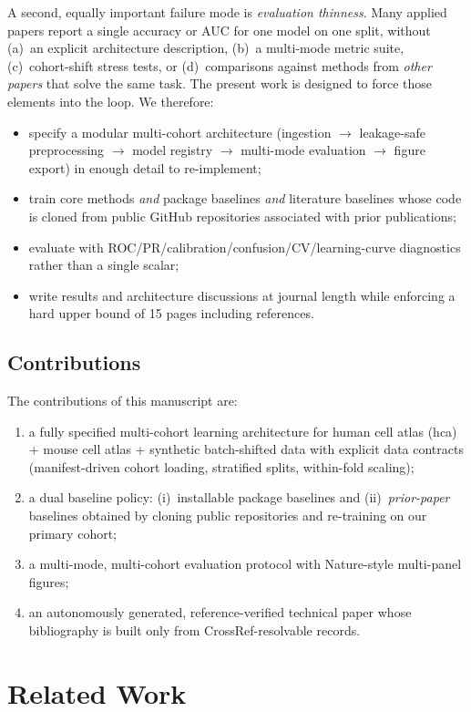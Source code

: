 \documentclass[10pt,journal]{IEEEtran}
\begin{document}
A second, equally important failure mode is \emph{evaluation thinness}. Many applied
papers report a single accuracy or AUC for one model on one split, without (a)~an explicit
architecture description, (b)~a multi-mode metric suite, (c)~cohort-shift stress tests, or
(d)~comparisons against methods from \emph{other papers} that solve the same task. The
present work is designed to force those elements into the loop. We therefore:
\begin{itemize}
\item specify a modular multi-cohort architecture (ingestion $\rightarrow$ leakage-safe
preprocessing $\rightarrow$ model registry $\rightarrow$ multi-mode evaluation $\rightarrow$
figure export) in enough detail to re-implement;
\item train core methods \emph{and} package baselines \emph{and} literature baselines whose
code is cloned from public GitHub repositories associated with prior publications;
\item evaluate with ROC/PR/calibration/confusion/CV/learning-curve diagnostics rather than a
single scalar;
\item write results and architecture discussions at journal length while enforcing a hard
upper bound of 15 pages including references.
\end{itemize}

\subsection{Contributions}
The contributions of this manuscript are:
\begin{enumerate}
\item a fully specified multi-cohort learning architecture for human cell atlas (hca) + mouse cell atlas + synthetic batch-shifted data with explicit
data contracts (manifest-driven cohort loading, stratified splits, within-fold scaling);
\item a dual baseline policy: (i)~installable package baselines and (ii)~\emph{prior-paper}
baselines obtained by cloning public repositories and re-training on our primary cohort;
\item a multi-mode, multi-cohort evaluation protocol with Nature-style multi-panel figures;
\item an autonomously generated, reference-verified technical paper whose bibliography is
built only from CrossRef-resolvable records.
\end{enumerate}

\section{Related Work}
\label{sec:related}
\end{document}
